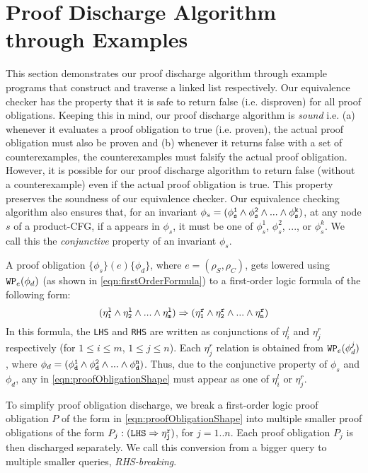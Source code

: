 \section{Proof Discharge Algorithm through Examples}
\label{sec:syn-examples}
This section demonstrates our proof discharge algorithm through example programs
that construct and traverse a linked list respectively. Our equivalence checker has the property
that it is safe to return false (i.e. disproven) for all proof obligations. Keeping this in mind,
our proof discharge algorithm is {\em sound} i.e. (a) whenever it evaluates a proof obligation
to true (i.e. proven), the actual proof obligation must also be proven and (b) whenever it returns
false with a set of counterexamples, the counterexamples must falsify the actual proof obligation.
However, it is possible for our proof discharge algorithm to return false (without a counterexample)
even if the actual proof obligation is true. This property preserves the soundness of our equivalence checker.
Our equivalence checking algorithm also ensures that, for an invariant
$\phi_s=({\tt \phi^{1}_s \land \phi^{2}_s \land ... \land \phi^{k}_s})$,
at any node $s$ of a product-CFG,
if a \recursiveRelation{} appears in $\phi_s$, it
must be one of $\phi^{1}_s$, $\phi^{2}_s$, ..., or $\phi^{k}_s$. We call
this the {\em conjunctive \recursiveRelation{}} property of an invariant $\phi_s$.

A proof obligation
$\{\phi_s\}(e)\{\phi_d\}$, where $e=(\rho_S,\rho_C)$,
gets lowered using
${\tt WP}_{e}(\phi_d)$ (as shown in \cref{eqn:firstOrderFormula}) to a first-order logic formula of the following form:
\begin{equation}\label{eqn:proofObligationShape}
({\tt \eta^{l}_1 \land \eta^{l}_2 \land ... \land \eta^{l}_m}) \Rightarrow ({\tt \eta^{r}_1 \land \eta^{r}_2 \land ... \land \eta^{r}_n})
\end{equation}
In
this formula,
the {\tt LHS} and {\tt RHS} are
written as conjunctions of $\eta^{l}_i$ and $\eta^{r}_j$ respectively (for $1\leq i\leq m$, $1\leq j\leq n$).
Each $\eta^{r}_j$ relation is obtained from
${\tt WP}_{e}(\phi^{j}_d)$, where $\phi_d=({\tt \phi^{1}_d \land \phi^{2}_d \land ... \land \phi^{n}_d})$.
Thus, due to the conjunctive \recursiveRelation{} property of $\phi_s$ and $\phi_d$, any
\recursiveRelation{} in \cref{eqn:proofObligationShape} must appear as
one of $\eta^{l}_i$ or $\eta^{r}_j$.

To simplify proof obligation discharge,
we break a first-order logic proof obligation $P$ of the form in \cref{eqn:proofObligationShape}
into multiple smaller proof obligations
of the form
$P_j:({\tt LHS}\Rightarrow{\tt \eta^{r}_j})$, for $j=1..n$. Each proof obligation
$P_j$ is then discharged separately.  We call this conversion from
a bigger query to multiple smaller queries, {\em RHS-breaking}.

